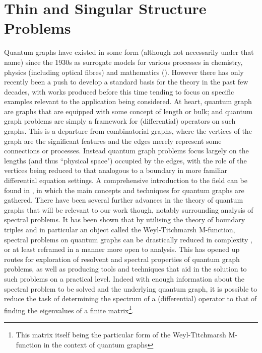 \section{Thin and Singular Structure Problems} \label{sec:GraphLitReview}
Quantum graphs have existed in some form (although not necessarily under that name) since the 1930s \cite{berkolaiko2013introduction} as surrogate models for various processes in chemistry, physics (including optical fibres) and mathematics ().
However there has only recently been a push to develop a standard basis for the theory in the past few decades, with works produced before this time tending to focus on specific examples relevant to the application being considered.
At heart, quantum graph are graphs that are equipped with some concept of length or bulk; and quantum graph problems are simply a framework for (differential) operators on such graphs.
This is a departure from combinatorial graphs, where the vertices of the graph are the significant features and the edges merely represent some connections or processes.
Instead quantum graph problems focus largely on the lengths (and thus ``physical space") occupied by the edges, with the role of the vertices being reduced to that analogous to a boundary in more familiar differential equation settings.
A comprehensive introduction to the field can be found in \cite{berkolaiko2013introduction}, in which the main concepts and techniques for quantum graphs are gathered.
There have been several further advances in the theory of quantum graphs that will be relevant to our work though, notably surrounding analysis of spectral problems. 
It has been shown that by utilising the theory of boundary triples  and in particular an object called the Weyl-Titchmarsh M-function, spectral problems on quantum graphs can be drastically reduced in complexity , or at least reframed in a manner more open to analysis.
This has opened up routes for exploration of resolvent and spectral properties of quantum graph problems, as well as producing tools and techniques that aid in the solution to such problems on a practical level.
Indeed with enough information about the spectral problem to be solved and the underlying quantum graph, it is possible to reduce the task of determining the spectrum of a (differential) operator to that of finding the eigenvalues of a finite matrix\footnote{This matrix itself being the particular form of the Weyl-Titchmarsh M-function in the context of quantum graphs}.
